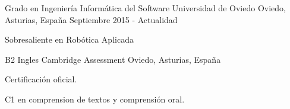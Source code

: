 

\begin{cventries}

  \cventry
  {Grado en Ingeniería Informática del Software} %
  {Universidad de Oviedo} %
  {Oviedo, Asturias, España} %
  {Septiembre 2015 - Actualidad} %
  {
    \begin{cvitems} %
      \item {Sobresaliente en Robótica Aplicada}
    \end{cvitems}
  }

  \cventry
  {B2 Ingles} %
  {Cambridge Assessment} %
  {Oviedo, Asturias, España} %
  {} %
  {
    \begin{cvitems} %
      \item {Certificación oficial.}
      \item {C1 en comprension de textos y comprensión oral.}
    \end{cvitems}
  }

\end{cventries}
